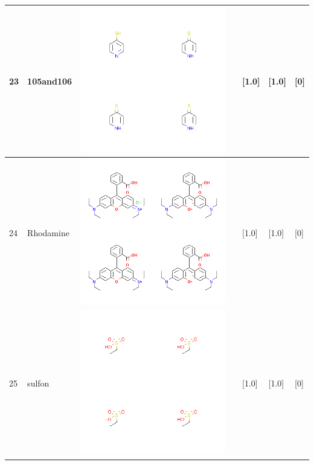 \begin{longtable}{|l|l|l|l|l|l|l|}
\hline
23 & 105and106 & \includegraphics[scale=0.6]{105and106CA.png} & & [1.0]& [1.0] & [0] \\
\hline
24 & Rhodamine & \includegraphics[scale=0.6]{RhodamineCA.png} & & [1.0]& [1.0] & [0] \\
\hline
25 & sulfon & \includegraphics[scale=0.6]{sulfonCA.png} & & [1.0]& [1.0] & [0] \\

\end{longtable}

